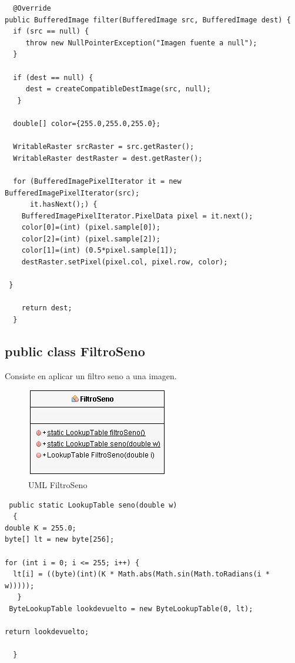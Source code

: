 \begin{lstlisting}
  @Override
public BufferedImage filter(BufferedImage src, BufferedImage dest) {
  if (src == null) {
     throw new NullPointerException("Imagen fuente a null");
  }
    
  if (dest == null) {
     dest = createCompatibleDestImage(src, null);
   }

  double[] color={255.0,255.0,255.0};
         
  WritableRaster srcRaster = src.getRaster();
  WritableRaster destRaster = dest.getRaster();
        
  for (BufferedImagePixelIterator it = new BufferedImagePixelIterator(src); 
      it.hasNext();) {
    BufferedImagePixelIterator.PixelData pixel = it.next();
    color[0]=(int) (pixel.sample[0]);
    color[2]=(int) (pixel.sample[2]);
    color[1]=(int) (0.5*pixel.sample[1]);
    destRaster.setPixel(pixel.col, pixel.row, color);
            
 }
        
    return dest;
  } 
\end{lstlisting}

\subsection*{public class FiltroSeno}
Consiste en aplicar un filtro seno\cite{apuntessmm} a una imagen.

\begin{figure}[H]
  \centering
    \includegraphics[scale=0.75]{images/filtroseno}
  \caption{UML FiltroSeno}
  \label{UML FiltroSeno}
\end{figure}

\begin{lstlisting}
 public static LookupTable seno(double w)
  {
double K = 255.0;
byte[] lt = new byte[256];
    
for (int i = 0; i <= 255; i++) {
  lt[i] = ((byte)(int)(K * Math.abs(Math.sin(Math.toRadians(i * w)))));
   }
 ByteLookupTable lookdevuelto = new ByteLookupTable(0, lt);
    
return lookdevuelto;
    
  }
 \end{lstlisting} 
 
